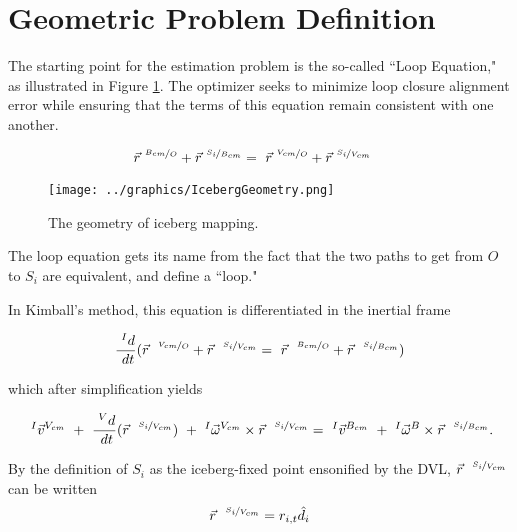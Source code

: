
\section{Geometric Problem Definition}

The starting point for the estimation problem is the so-called ``Loop Equation," as illustrated in Figure \ref{fig:LoopEquation}. The optimizer seeks to minimize loop closure alignment error while ensuring that the terms of this equation remain consistent with one another. 

\begin{align}
\vec{r}^{~\nicefrac{B_{cm}}{O}} + \vec{r}^{~\nicefrac{S_i}{B_{cm}}} &= ~\vec{r}^{~\nicefrac{V_{cm}}{O}} + \vec{r}^{~\nicefrac{S_i}{V_{cm}}}
\label{eqn:BasicLoop}
\end{align}

\begin{figure}[htbp]
   \centering
   \texttt{[image: ../graphics/IcebergGeometry.png]} %
   \caption{The geometry of iceberg mapping. }  
    \label{fig:LoopEquation}
\end{figure}

The loop equation gets its name from the fact that the two paths to get from $O$ to $S_i$ are equivalent, and define a ``loop."

In Kimball's method, this equation is differentiated in the inertial frame

\begin{equation} %
   \frac{~^Id}{~dt}(\vec{r}^{~~\nicefrac{V_{cm}}{O}} + \vec{r}^{~~\nicefrac{S_i}{V_{cm}}} = ~ \vec{r}^{~~\nicefrac{B_{cm}}{O}} + \vec{r}^{~~\nicefrac{S_i}{B_{cm}}})\\
   \end{equation}
   
   which after simplification yields 
   
       \begin{equation}
    ~^{I}\vec{v}^{V_{cm}} ~+~ \frac{~^Vd}{~dt}(\vec{r}^{~~\nicefrac{S_i}{V_{cm}}} ) ~+~ ^{I}\vec{\omega}^{V_{cm}}\times\vec{r}^{~~\nicefrac{S_i}{V_{cm}}}  = 
    ~^{I}\vec{v}^{B_{cm}} ~+~^{I}\vec{\omega}^{B}\times\vec{r}^{~~\nicefrac{S_i}{B_{cm}}}. \\
\end{equation}

By the definition of $S_i$ as the iceberg-fixed point ensonified by the DVL,  $\vec{r}^{~~\nicefrac{S_i}{V_{cm}}}$ can be written 
\begin{equation}
\vec{r}^{~~\nicefrac{S_i}{V_{cm}}}= r_{i,t}\hat{d}_{i}  
\label{eqn:SiDef}
\end{equation}

